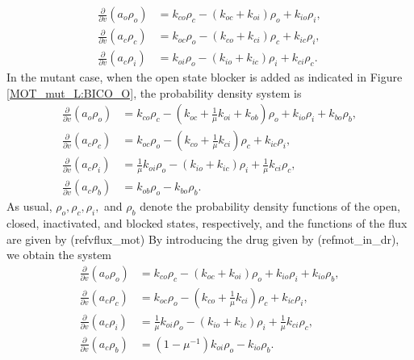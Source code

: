 \begin{align}
\frac{\partial}{\partial v}\left(  a_{o}\rho_{o}\right)   &  =k_{co}\rho
_{c}-\left(  k_{oc}+k_{oi}\right)  \rho_{o}+k_{io}\rho_{i},\nonumber\\
\frac{\partial}{\partial v}\left(  a_{c}\rho_{c}\right)   &  =k_{oc}\rho
_{o}-\left(  k_{co}+k_{ci}\right)  \rho_{c}+k_{ic}\rho_{i},\label{wt_mt_in}\\
\frac{\partial}{\partial v}\left(  a_{c}\rho_{i}\right)   &  =k_{oi}\rho
_{o}-(k_{io}+k_{ic})\rho_{i}+k_{ci}\rho_{c}.\nonumber
\end{align}
In the mutant case, when the open state blocker is added as indicated in Figure
\ref{MOT_mut_L:BICO_O}, the probability density system is
\begin{align}
\frac{\partial}{\partial v}\left(  a_{o}\rho_{o}\right)   &  =k_{co}\rho
_{c}-\left(  k_{oc}+\frac{1}{\mu}k_{oi}+k_{ob}\right)  \rho_{o}+k_{io}\rho_{i}
+k_{bo}\rho_{b},\nonumber\\
\frac{\partial}{\partial v}\left(  a_{c}\rho_{c}\right)   &  =k_{oc}\rho
_{o}-\left(  k_{co}+\frac{1}{\mu}k_{ci}\right)  \rho_{c}+k_{ic}\rho
_{i},\label{mot_dr_123}\\
\frac{\partial}{\partial v}\left(  a_{c}\rho_{i}\right)   &  =\frac{1}{\mu
}k_{oi}\rho_{o}-(k_{io}+k_{ic})\rho_{i}+\frac{1}{\mu}k_{ci}\rho_{c}
,\nonumber\\
\frac{\partial}{\partial v}\left(  a_{c}\rho_{b}\right)   &  =k_{ob}\rho
_{o}-k_{bo}\rho_{b}.\nonumber
\end{align}
As usual, $\rho_{o},\rho_{c},\rho_{i},$ and $\rho_{b}$ denote the probability density
functions of the open, closed, inactivated, and blocked states, respectively,
and the functions of the flux are given by (ref{vflux_mot}) By introducing
the drug given by (ref{mot_in_dr}), we obtain the system
\begin{align}
\frac{\partial}{\partial v}\left(  a_{o}\rho_{o}\right)   &  =k_{co}\rho
_{c}-\left(  k_{oc}+k_{oi}\right)  \rho_{o}+k_{io}\rho_{i}
+k_{io}\rho_{b},\nonumber\\
\frac{\partial}{\partial v}\left(  a_{c}\rho_{c}\right)   &  =k_{oc}\rho
_{o}-\left(  k_{co}+\frac{1}{\mu}k_{ci}\right)  \rho_{c}+k_{ic}\rho
_{i},\label{mot_dr_124}\\
\frac{\partial}{\partial v}\left(  a_{c}\rho_{i}\right)   &  =\frac{1}{\mu
}k_{oi}\rho_{o}-(k_{io}+k_{ic})\rho_{i}+\frac{1}{\mu}k_{ci}\rho_{c}
,\nonumber\\
\frac{\partial}{\partial v}\left(  a_{c}\rho_{b}\right)   &  =\left(
1-\mu^{-1}\right)  k_{oi}\rho_{o}-k_{io}\rho_{b}.\nonumber
\end{align}
